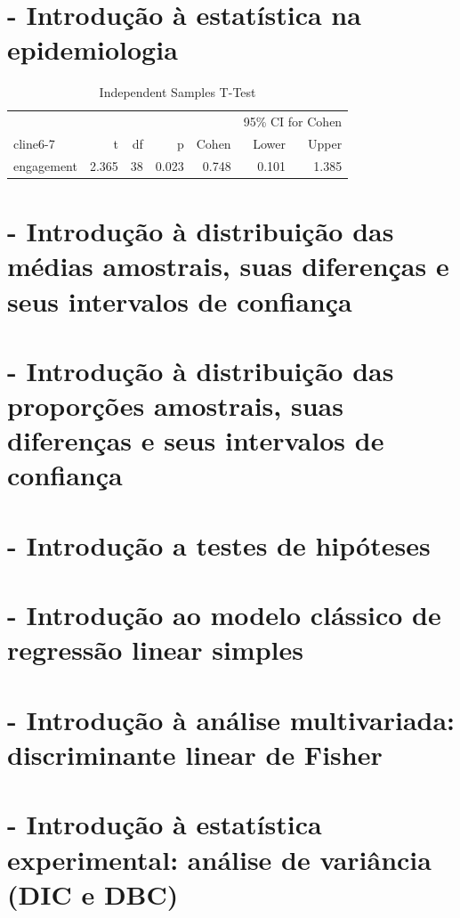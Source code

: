 \documentclass[
]{book}
\begin{document}
\hypertarget{estatistica_epidemiologia}{%
\chapter{- Introdução à estatística na epidemiologia}\label{estatistica_epidemiologia}}

\begin{table}[h]
\centering
\caption{Independent Samples T-Test}
\label{tab:independentSamplesT-Test}
{
\begin{tabular}{lrrrrrr}
\toprule
\multicolumn{1}{c}{} & \multicolumn{1}{c}{} & \multicolumn{1}{c}{} & \multicolumn{1}{c}{} & \multicolumn{1}{c}{} & \multicolumn{2}{c}{95\% CI for Cohen} \\
cline{6-7}
& t & df & p & Cohen & Lower & Upper  \\
\cmidrule[0.4pt]{1-7}
engagement & 2.365 & 38 & 0.023 & 0.748 & 0.101 & 1.385  \\
\bottomrule
\end{tabular}
}
\end{table}

\hypertarget{dist_medias_amostrais}{%
\chapter{- Introdução à distribuição das médias amostrais, suas diferenças e seus intervalos de confiança}\label{dist_medias_amostrais}}

\hypertarget{dist_prop_amostrais}{%
\chapter{- Introdução à distribuição das proporções amostrais, suas diferenças e seus intervalos de confiança}\label{dist_prop_amostrais}}

\hypertarget{teste_hipoteses}{%
\chapter{- Introdução a testes de hipóteses}\label{teste_hipoteses}}

\hypertarget{reg_simples}{%
\chapter{- Introdução ao modelo clássico de regressão linear simples}\label{reg_simples}}

\hypertarget{disc_fisher}{%
\chapter{- Introdução à análise multivariada: discriminante linear de Fisher}\label{disc_fisher}}

\hypertarget{anova}{%
\chapter{- Introdução à estatística experimental: análise de variância (DIC e DBC)}\label{anova}}

  
\end{document}
